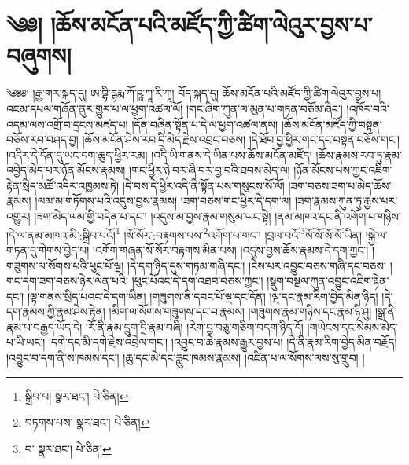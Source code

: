 \setcounter{footnote}{0} 
\chapter{༄༅། །ཆོས་མངོན་པའི་མཛོད་ཀྱི་ཚིག་ལེའུར་བྱས་པ་བཞུགས། }༄༅༅། །རྒྱ་གར་སྐད་དུ། ཨ་བྷི་དྷརྨ་ཀོ་ཥཱ་ཀཱ་རི་ཀཱ། བོད་སྐད་དུ། ཆོས་མངོན་པའི་མཛོད་ཀྱི་ཚིག་ལེའུར་བྱས་པ། འཇམ་དཔལ་གཞོན་ནུར་གྱུར་པ་ལ་ཕྱག་འཚལ་ལོ། །གང་ཞིག་ཀུན་ལ་མུན་པ་གཏན་བཅོམ་ཞིང་། །འཁོར་བའི་འདམ་ལས་འགྲོ་བ་དྲངས་མཛད་པ། །དོན་བཞིན་སྟོན་པ་དེ་ལ་ཕྱག་འཚལ་ནས། །ཆོས་མངོན་མཛོད་ཀྱི་བསྟན་བཅོས་རབ་བཤད་བྱ། །ཆོས་མངོན་ཤེས་རབ་དྲི་མེད་རྗེས་འབྲང་བཅས། །དེ་ཐོབ་བྱ་ཕྱིར་གང་དང་བསྟན་བཅོས་གང་། །འདིར་དེ་དོན་དུ་ཡང་དག་ཆུད་ཕྱིར་རམ། །འདི་ཡི་གནས་དེ་ཡིན་པས་ཆོས་མངོན་མཛོད། །ཆོས་རྣམས་རབ་ཏུ་རྣམ་འབྱེད་མེད་པར་ཉོན་མོངས་རྣམས། །གང་ཕྱིར་ཉེ་བར་ཞི་བར་བྱ་བའི་ཐབས་མེད་ལ། །ཉོན་མོངས་པས་ཀྱང་འཇིག་རྟེན་སྲིད་མཚོ་འདིར་འཁྱམས་ཏེ། །དེ་བས་དེ་ཕྱིར་འདི་ནི་སྟོན་པས་གསུངས་སོ་ལོ། །ཟག་བཅས་ཟག་པ་མེད་ཆོས་རྣམས། །ལམ་མ་གཏོགས་པའི་འདུས་བྱས་རྣམས། །ཟག་བཅས་གང་ཕྱིར་དེ་དག་ལ། །ཟག་རྣམས་ཀུན་ཏུ་རྒྱས་པར་འགྱུར། །ཟག་མེད་ལམ་གྱི་བདེན་པ་དང་། །འདུས་མ་བྱས་རྣམ་གསུམ་ཡང་སྟེ། །ནམ་མཁའ་དང་ནི་འགོག་པ་གཉིས། །དེ་ལ་ནམ་མཁའ་མི་:སྒྲིབ་པའོ།\footnote{སྒྲིབ་པ།  སྣར་ཐང་།  པེ་ཅིན། } །སོ་སོར་:བརྟགས་པས་\footnote{བཏགས་པས་  སྣར་ཐང་།  པེ་ཅིན། }འགོག་པ་གང་། །བྲལ་བའོ་\footnote{བ་  སྣར་ཐང་།  པེ་ཅིན། }སོ་སོ་སོ་སོ་ཡིན། །སྐྱེ་ལ་གཏན་དུ་གེགས་བྱེད་པ། །འགོག་གཞན་སོ་སོར་བརྟགས་མིན་པས། །འདུས་བྱས་ཆོས་རྣམས་དེ་དག་ཀྱང་། །གཟུགས་ལ་སོགས་པའི་ཕུང་པོ་ལྔ། །དེ་དག་ཉིད་དུས་གཏམ་གཞི་དང་། །ངེས་པར་འབྱུང་བཅས་གཞི་དང་བཅས། །གང་དག་ཟག་བཅས་ཉེར་ལེན་པའི། །ཕུང་པོའང་དེ་དག་འཐབ་བཅས་ཀྱང་། །སྡུག་བསྔལ་ཀུན་འབྱུང་འཇིག་རྟེན་དང་། །ལྟ་གནས་སྲིད་པའང་དེ་དག་ཡིན། །གཟུགས་ནི་དབང་པོ་ལྔ་དང་དོན། །ལྔ་དང་རྣམ་རིག་བྱེད་མིན་ཉིད། །དེ་དག་རྣམས་ཀྱི་རྣམ་ཤེས་རྟེན། །མིག་ལ་སོགས་གཟུགས་དང་བ་རྣམས། །གཟུགས་རྣམ་གཉིས་དང་རྣམ་ཉི་ཤུ། །སྒྲ་ནི་རྣམ་པ་བརྒྱད་ཡོད་དེ། །རོ་ནི་རྣམ་དྲུག་དྲི་རྣམ་བཞི། །རེག་བྱ་བཅུ་གཅིག་བདག་ཉིད་དོ། །གཡེངས་དང་སེམས་མེད་པ་ཡི་ཡང་། །དགེ་དང་མི་དགེ་རྗེས་འབྲེལ་གང་། །འབྱུང་བ་ཆེ་རྣམས་རྒྱུར་བྱས་པ། །དེ་ནི་རྣམ་རིག་བྱེད་མིན་བརྗོད། །འབྱུང་བ་དག་ནི་ས་ཁམས་དང་། །ཆུ་དང་མེ་དང་རླུང་ཁམས་རྣམས། །འཛིན་པ་ལ་སོགས་ལས་སུ་གྲུབ། །
